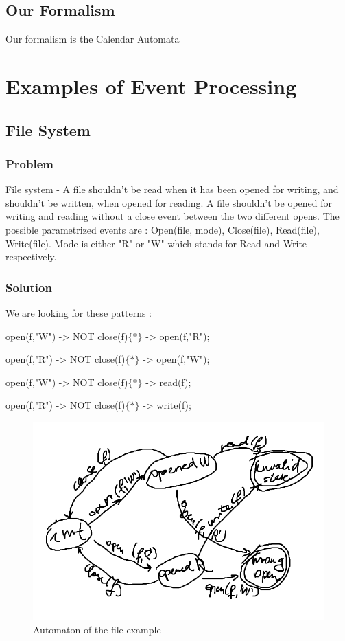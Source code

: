 		\subsection{Our Formalism}
			Our formalism is the Calendar Automata
	\section{Examples of Event Processing}
 
		\subsection{File System}
			\subsubsection{Problem}
				File system - A file shouldn't be read when it has been opened for writing, and shouldn't be written, when opened for reading. 
				A file shouldn't be opened for writing and reading without a close event between the two different opens.
				The possible parametrized events are : Open(file, mode), Close(file), Read(file), Write(file). Mode is either "R" or "W" which stands for Read and Write respectively.
			\subsubsection{Solution}
				We are looking for these patterns : 
				
				open(f,"W") -> NOT close(f)$\{\ast\}$ -> open(f,"R");
				
				open(f,"R") -> NOT close(f)$\{\ast\}$ -> open(f,"W");
				
				open(f,"W") -> NOT close(f)$\{\ast\}$ -> read(f);
				
				open(f,"R") -> NOT close(f)$\{\ast\}$ -> write(f);
				
				\begin{figure}[h]
				\centering
				\includegraphics[width=0.5\linewidth]{include/figures/chapter_5/fileautomaton}
				\caption{Automaton of the file example}
				\label{fig:cep:fileautomaton}
				\end{figure}

